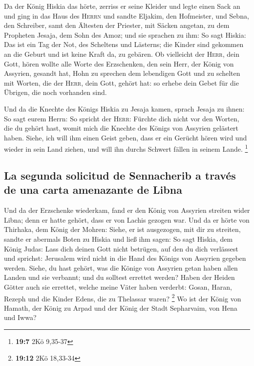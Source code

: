  Da der König Hiskia das hörte, zerriss er seine Kleider
und legte einen Sack an und ging in das Haus des \textsc{Herrn}
 und sandte Eljakim, den Hofmeister, und Sebna, den
Schreiber, samt den Ältesten der Priester, mit Säcken angetan, zu dem
Propheten Jesaja, dem Sohn des Amoz;  und sie sprachen zu
ihm: So sagt Hiskia: Das ist ein Tag der Not, des Scheltens und
Lästerns; die Kinder sind gekommen an die Geburt und ist keine Kraft da,
zu gebären.  Ob vielleicht der \textsc{Herr}, dein Gott,
hören wollte alle Worte des Erzschenken, den sein Herr, der König von
Assyrien, gesandt hat, Hohn zu sprechen dem lebendigen Gott und zu
schelten mit Worten, die der \textsc{Herr}, dein Gott, gehört hat: so
erhebe dein Gebet für die Übrigen, die noch vorhanden sind.

 Und da die Knechte des Königs Hiskia zu Jesaja kamen,
 sprach Jesaja zu ihnen: So sagt eurem Herrn: So spricht
der \textsc{Herr}: Fürchte dich nicht vor den Worten, die du gehört
hast, womit mich die Knechte des Königs von Assyrien gelästert haben.
 Siehe, ich will ihm einen Geist geben, dass er ein
Gerücht hören wird und wieder in sein Land ziehen, und will ihn durchs
Schwert fällen in seinem Lande. \footnote{\textbf{19:7} 2Kö 9,35-37}

\hypertarget{la-segunda-solicitud-de-sennacherib-a-travuxe9s-de-una-carta-amenazante-de-libna}{%
\subsection{La segunda solicitud de Sennacherib a través de una carta
amenazante de
Libna}\label{la-segunda-solicitud-de-sennacherib-a-travuxe9s-de-una-carta-amenazante-de-libna}}

 Und da der Erzschenke wiederkam, fand er den König von
Assyrien streiten wider Libna; denn er hatte gehört, dass er von Lachis
gezogen war.  Und da er hörte von Thirhaka, dem König der
Mohren: Siehe, er ist ausgezogen, mit dir zu streiten, sandte er
abermals Boten zu Hiskia und ließ ihm sagen:  So sagt
Hiskia, dem König Judas: Lass dich deinen Gott nicht betrügen, auf den
du dich verlässest und sprichst: Jerusalem wird nicht in die Hand des
Königs von Assyrien gegeben werden.  Siehe, du hast
gehört, was die Könige von Assyrien getan haben allen Landen und sie
verbannt; und du solltest errettet werden?  Haben der
Heiden Götter auch sie errettet, welche meine Väter haben verderbt:
Gosan, Haran, Rezeph und die Kinder Edens, die zu Thelassar waren?
\footnote{\textbf{19:12} 2Kö 18,33-34}  Wo ist der König
von Hamath, der König zu Arpad und der König der Stadt Sepharvaim, von
Hena und Iwwa?

